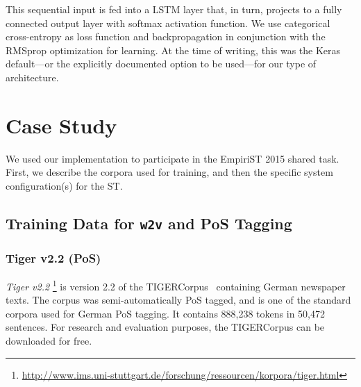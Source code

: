 \documentclass[11pt]{article}
\newcommand\wtv{\texttt{w2v}\xspace}
\begin{document}
This sequential input is fed into a LSTM layer that, in turn, projects to a
fully connected output layer with softmax activation function.
We use categorical cross-entropy as loss function and backpropagation in
conjunction with the RMSprop optimization for learning.  
At the time of writing, this was the Keras default---or the explicitly
documented option to be used---for our type of architecture. 


\section{Case Study} %
\label{sec:casestudies}


% 




We used our implementation to participate in the EmpiriST 2015 shared task.
First, we describe the corpora used for training, and then the specific system
configuration(s) for the ST.


\subsection{Training Data for \wtv and PoS Tagging} %
\subsubsection{Tiger v2.2 (PoS)} %
\emph{Tiger v2.2}%
\footnote{\url{http://www.ims.uni-stuttgart.de/forschung/ressourcen/korpora/tiger.html}}
is version 2.2 of the TIGERCorpus~\cite{Brants2004} containing German newspaper
texts. 
The corpus was semi-automatically PoS tagged, and is one of the standard
corpora used for German PoS tagging. 
It contains 888,238 tokens in 50,472 sentences.
For research and evaluation purposes, the TIGERCorpus can be downloaded for
free.
\end{document}
